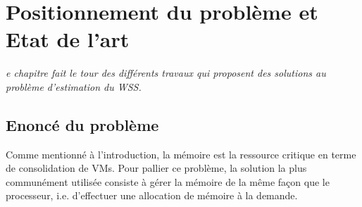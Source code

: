 \let\textcircled=\pgftextcircled
\chapter{Positionnement du problème et Etat de l'art}
\label{chap:etat_de_lart}

\textit{e chapitre fait le tour des différents travaux qui proposent des solutions au problème d'estimation du WSS.}

\minitoc

\newpage    
\section{Enoncé du problème}
Comme mentionné à l'introduction, la mémoire est la ressource critique en terme de consolidation de VMs. Pour pallier ce problème, la solution la plus communément utilisée consiste à gérer la mémoire de la même façon que le processeur, i.e. d'effectuer une allocation de mémoire à la demande. 

